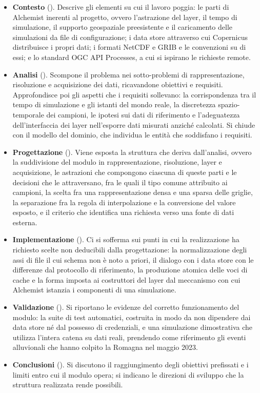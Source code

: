 \begin{itemize}
  \item \textbf{Contesto} (). Descrive gli elementi su cui il
  lavoro poggia: le parti di Alchemist inerenti al progetto, ovvero l'astrazione del
  layer, il tempo di simulazione, il supporto geospaziale preesistente e il caricamento
  delle simulazioni da file di configurazione; i data store attraverso cui Copernicus
  distribuisce i propri dati; i formati NetCDF e GRIB e le convenzioni su di essi;
  e lo standard OGC API Processes, a cui si ispirano le richieste remote.

  \item \textbf{Analisi} (). Scompone il problema nei sotto-problemi
  di rappresentazione, risoluzione e acquisizione dei dati, ricavandone obiettivi e
  requisiti. Approfondisce poi gli aspetti che i requisiti sollevano: la corrispondenza
  tra il tempo di simulazione e gli istanti del mondo reale, la discretezza
  spazio-temporale dei campioni, le ipotesi sui dati di riferimento e l'adeguatezza
  dell'interfaccia dei layer nell'esporre dati misurati anziché calcolati. Si chiude con
  il modello del dominio, che individua le entità che soddisfano i requisiti.

  \item \textbf{Progettazione} (). Viene esposta la struttura che
  deriva dall'analisi, ovvero la suddivisione del modulo in rappresentazione,
  risoluzione, layer e acquisizione, le astrazioni che compongono ciascuna di queste
  parti e le decisioni che le attraversano, fra le quali il tipo comune attribuito ai
  campioni, la scelta fra una rappresentazione densa e una sparsa delle griglie, la
  separazione fra la regola di interpolazione e la conversione del valore esposto, e il
  criterio che identifica una richiesta verso una fonte di dati esterna.

  \item \textbf{Implementazione} (). Ci si sofferma sui punti
  in cui la realizzazione ha richiesto scelte non deducibili dalla progettazione: la
  normalizzazione degli assi di file il cui schema non è noto a priori, il dialogo con
  i data store con le differenze dal protocollo di riferimento, la produzione
  atomica delle voci di cache e la forma imposta ai costruttori del layer dal
  meccanismo con cui Alchemist istanzia i componenti di una simulazione.

  \item \textbf{Validazione} (). Si riportano le evidenze
  del corretto funzionamento del modulo: la suite di test automatici, costruita in modo
  da non dipendere dai data store né dal possesso di credenziali, e una simulazione dimostrativa che
  utilizza l'intera catena su dati reali, prendendo come riferimento gli eventi alluvionali
  che hanno colpito la Romagna nel maggio 2023.

  \item \textbf{Conclusioni} (). Si discutono il raggiungimento
  degli obiettivi prefissati e i limiti entro cui il modulo opera; si indicano le direzioni di
  sviluppo che la struttura realizzata rende possibili.
\end{itemize}
